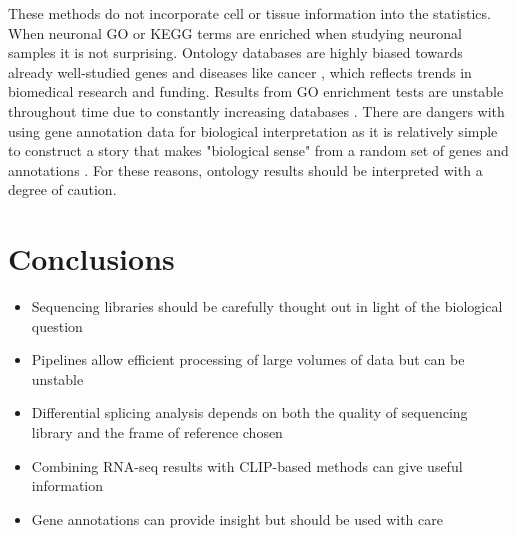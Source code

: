 These methods do not incorporate cell or tissue information into the statistics. When neuronal GO or KEGG terms are enriched when studying neuronal samples it is not surprising.
Ontology databases are highly biased towards already well-studied genes and diseases like cancer \citep{Haynes2018}, which reflects trends in biomedical research and funding. 
Results from GO enrichment tests are unstable throughout time due to constantly increasing databases \citep{Tomczak2018}.
There are dangers with using gene annotation data for biological interpretation as it is relatively simple to construct a story that makes "biological sense" from a random set of genes and annotations \citep{Pavlidis2012}.
For these reasons, ontology results should be interpreted with a degree of caution.


\section{Conclusions}

\begin{itemize}
	\item Sequencing libraries should be carefully thought out in light of the biological question
	\item Pipelines allow efficient processing of large volumes of data but can be unstable
	\item Differential splicing analysis depends on both the quality of sequencing library and the frame of reference chosen 
	\item Combining RNA-seq results with CLIP-based methods can give useful information
	\item Gene annotations can provide insight but should be used with care
\end{itemize}









